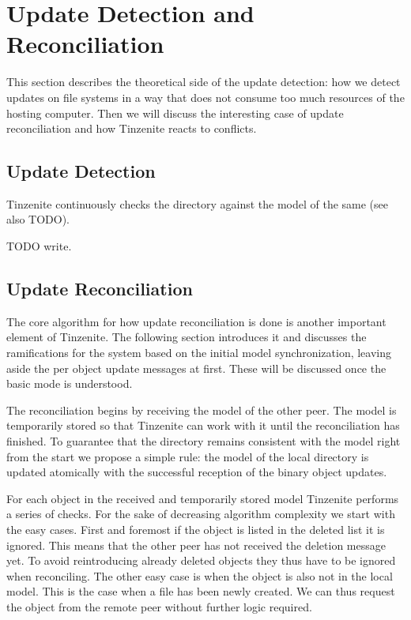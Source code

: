 \section{Update Detection and Reconciliation}
\label{sec:Update Detection and Reconciliation}

This section describes the theoretical side of the update detection: how we detect updates on file systems in a way that does not consume too much resources of the hosting computer.
Then we will discuss the interesting case of update reconciliation and how Tinzenite reacts to conflicts.

\subsection{Update Detection}
\label{sub:Update Detection}

Tinzenite continuously checks the directory against the model of the same (see also TODO).

TODO write.

\subsection{Update Reconciliation}
\label{sub:Update Reconciliation}

The core algorithm for how update reconciliation is done is another important element of Tinzenite.
The following section introduces it and discusses the ramifications for the system based on the initial model synchronization, leaving aside the per object update messages at first.
These will be discussed once the basic mode is understood.

The reconciliation begins by receiving the model of the other peer.
The model is temporarily stored so that Tinzenite can work with it until the reconciliation has finished.
To guarantee that the directory remains consistent with the model right from the start we propose a simple rule: the model of the local directory is updated atomically with the successful reception of the binary object updates.

For each object in the received and temporarily stored model Tinzenite performs a series of checks.
For the sake of decreasing algorithm complexity we start with the easy cases.
First and foremost if the object is listed in the deleted list it is ignored.
This means that the other peer has not received the deletion message yet.
To avoid reintroducing already deleted objects they thus have to be ignored when reconciling.
The other easy case is when the object is also not in the local model.
This is the case when a file has been newly created.
We can thus request the object from the remote peer without further logic required.

